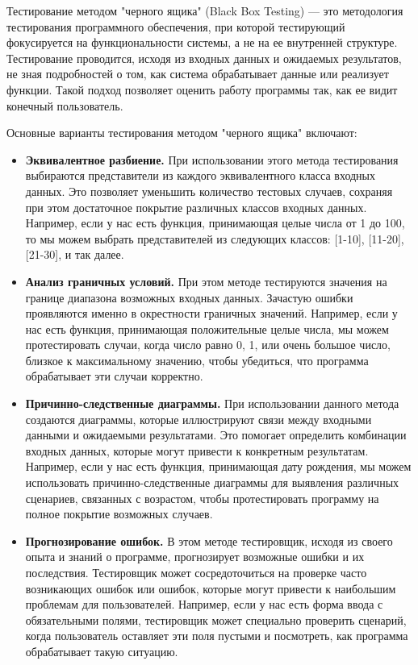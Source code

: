 \documentclass[12pt, a4paper]{book}%
\begin{document}
{Тестирование методом "черного ящика" (Black Box Testing) — это методология тестирования программного обеспечения, при которой тестирующий фокусируется на функциональности системы, а не на ее внутренней структуре. Тестирование проводится, исходя из входных данных и ожидаемых результатов, не зная подробностей о том, как система обрабатывает данные или реализует функции. Такой подход позволяет оценить работу программы так, как ее видит конечный пользователь.

Основные варианты тестирования методом "черного ящика" включают:

\begin{itemize}

\item {\bf Эквивалентное разбиение.} 
При использовании этого метода тестирования выбираются представители из каждого эквивалентного класса входных данных. Это позволяет уменьшить количество тестовых случаев, сохраняя при этом достаточное покрытие различных классов входных данных. Например, если у нас есть функция, принимающая целые числа от 1 до 100, то мы можем выбрать представителей из следующих классов: [1-10], [11-20], [21-30], и так далее.

\item {\bf Анализ граничных условий.} 
При этом методе тестируются значения на границе диапазона возможных входных данных. Зачастую ошибки проявляются именно в окрестности граничных значений. Например, если у нас есть функция, принимающая положительные целые числа, мы можем протестировать случаи, когда число равно 0, 1, или очень большое число, близкое к максимальному значению, чтобы убедиться, что программа обрабатывает эти случаи корректно.

\item {\bf Причинно-следственные диаграммы.} 
При использовании данного метода создаются диаграммы, которые иллюстрируют связи между входными данными и ожидаемыми результатами. Это помогает определить комбинации входных данных, которые могут привести к конкретным результатам. Например, если у нас есть функция, принимающая дату рождения, мы можем использовать причинно-следственные диаграммы для выявления различных сценариев, связанных с возрастом, чтобы протестировать программу на полное покрытие возможных случаев.

\item {\bf Прогнозирование ошибок.} 
В этом методе тестировщик, исходя из своего опыта и знаний о программе, прогнозирует возможные ошибки и их последствия. Тестировщик может сосредоточиться на проверке часто возникающих ошибок или ошибок, которые могут привести к наибольшим проблемам для пользователей. Например, если у нас есть форма ввода с обязательными полями, тестировщик может специально проверить сценарий, когда пользователь оставляет эти поля пустыми и посмотреть, как программа обрабатывает такую ситуацию.


\end{itemize}}
\end{document}
